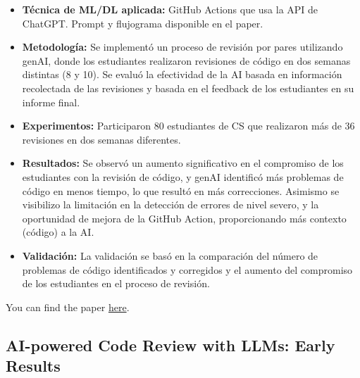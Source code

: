 \documentclass{article}
\begin{document}
\begin{itemize}
    \item \textbf{Técnica de ML/DL aplicada:} GitHub Actions que usa la API de ChatGPT. Prompt y flujograma disponible en el paper.
    \item \textbf{Metodología:} Se implementó un proceso de revisión por pares utilizando genAI, donde los estudiantes realizaron revisiones de código en dos semanas distintas (8 y 10). Se evaluó la efectividad de la AI basada en información recolectada de las revisiones y basada en el feedback de los estudiantes en su informe final.
    \item \textbf{Experimentos:} Participaron 80 estudiantes de CS que realizaron más de 36 revisiones en dos semanas diferentes.
    \item \textbf{Resultados:} Se observó un aumento significativo en el compromiso de los estudiantes con la revisión de código, y genAI identificó más problemas de código en menos tiempo, lo que resultó en más correcciones. Asimismo se visibilizo la limitación en la detección de errores de nivel severo, y la oportunidad de mejora de la GitHub Action, proporcionando más contexto (código) a la AI.
    \item \textbf{Validación:} La validación se basó en la comparación del número de problemas de código identificados y corregidos y el aumento del compromiso de los estudiantes en el proceso de revisión.
\end{itemize}
You can find the paper \href{https://publications.ascilite.org/index.php/APUB/article/view/482}{here}.


\subsection{AI-powered Code Review with LLMs: Early Results \cite{Rasheed_etal}}
\end{document}

